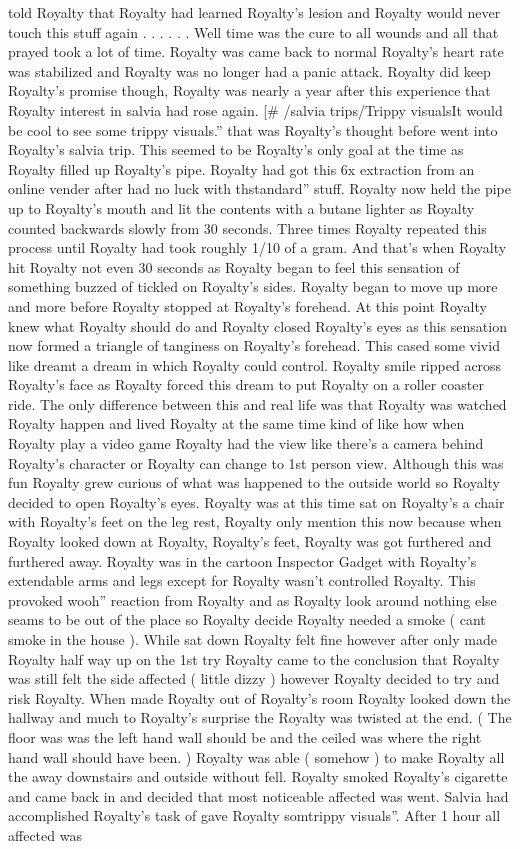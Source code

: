 \documentclass[12pt]{book}
\begin{document}
told Royalty that Royalty had learned Royalty's lesion and Royalty would never touch this stuff again . . .   . . . Well time was the cure to all wounds and all that prayed took a lot of time. Royalty was came back to normal Royalty's heart rate was stabilized and Royalty was no longer had a panic attack. Royalty did keep Royalty's promise though, Royalty was nearly a year after this experience that Royalty interest in salvia had rose again. [\# /salvia trips/Trippy visualsIt would be cool to see some trippy visuals.'' that was Royalty's thought before went into Royalty's salvia trip. This seemed to be Royalty's only goal at the time as Royalty filled up Royalty's pipe. Royalty had got this 6x extraction from an online vender after had no luck with thstandard'' stuff. Royalty now held the pipe up to Royalty's mouth and lit the contents with a butane lighter as Royalty counted backwards slowly from 30 seconds. Three times Royalty repeated this process until Royalty had took roughly 1/10 of a gram. And that's when Royalty hit Royalty not even 30 seconds as Royalty began to feel this sensation of something buzzed of tickled on Royalty's sides. Royalty began to move up more and more before Royalty stopped at Royalty's forehead. At this point Royalty knew what Royalty should do and Royalty closed Royalty's eyes as this sensation now formed a triangle of tanginess on Royalty's forehead. This cased some vivid like dreamt a dream in which Royalty could control. Royalty smile ripped across Royalty's face as Royalty forced this dream to put Royalty on a roller coaster ride. The only difference between this and real life was that Royalty was watched Royalty happen and lived Royalty at the same time kind of like how when Royalty play a video game Royalty had the view like there's a camera behind Royalty's character or Royalty can change to 1st person view. Although this was fun Royalty grew curious of what was happened to the outside world so Royalty decided to open Royalty's eyes. Royalty was at this time sat on Royalty's a chair with Royalty's feet on the leg rest, Royalty only mention this now because when Royalty looked down at Royalty, Royalty's feet, Royalty was got furthered and furthered away. Royalty was in the cartoon Inspector Gadget with Royalty's extendable arms and legs except for Royalty wasn't controlled Royalty. This provoked wooh'' reaction from Royalty and as Royalty look around nothing else seams to be out of the place so Royalty decide Royalty needed a smoke ( cant smoke in the house ). While sat down Royalty felt fine however after only made Royalty half way up on the 1st try Royalty came to the conclusion that Royalty was still felt the side affected ( little dizzy ) however Royalty decided to try and risk Royalty. When made Royalty out of Royalty's room Royalty looked down the hallway and much to Royalty's surprise the Royalty was twisted at the end. ( The floor was was the left hand wall should be and the ceiled was where the right hand wall should have been. ) Royalty was able ( somehow ) to make Royalty all the away downstairs and outside without fell. Royalty smoked Royalty's cigarette and came back in and decided that most noticeable affected was went. Salvia had accomplished Royalty's task of gave Royalty somtrippy visuals''. After 1 hour all affected was 
\end{document}
